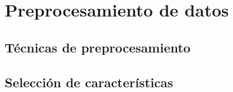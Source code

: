 \chapter{Preprocesamiento de datos}\label{chap:pre}
\section{Técnicas de preprocesamiento}

\section{Selección de características}
